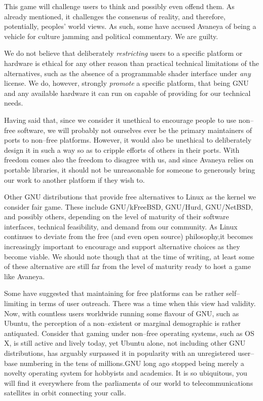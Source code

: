 This game will challenge users to think and possibly even offend them. As already mentioned, it challenges the consensus of reality, and therefore, potentially, peoples' world views. As such, some have accused Avaneya of being a vehicle for culture jamming and political commentary. We are guilty. 

We do not believe that deliberately {\it restricting} users to a specific platform or hardware is ethical for any other reason than practical technical limitations of the alternatives, such as the absence of a programmable shader interface under {\it any} license. We do, however, strongly {\it promote} a specific platform, that being GNU and any available hardware it can run on capable of providing for our technical needs.

Having said that, since we consider it unethical to encourage people to use non--free software, we will probably not ourselves ever be the primary maintainers of ports to non--free platforms. However, it would also be unethical to deliberately design it in such a way so as to cripple efforts of others in their ports. With freedom comes also the freedom to disagree with us, and since Avaneya relies on portable libraries, it should not be unreasonable for someone to generously bring our work to another platform if they wish to.

Other GNU distributions that provide free alternatives to Linux as the kernel we consider fair game. These include GNU/kFreeBSD, GNU/Hurd, GNU/NetBSD, and possibly others, depending on the level of maturity of their software interfaces, technical feasibility, and demand from our community. As Linux continues to deviate from the free (and even open source) philosophy, it becomes increasingly important to encourage and support alternative choices as they become viable. We should note though that at the time of writing, at least some of these alternative are still far from the level of maturity ready to host a game like Avaneya.

Some have suggested that maintaining for free platforms can be rather self--limiting in terms of user outreach. There was a time when this view had validity. Now, with countless users worldwide running some flavour of GNU, such as Ubuntu, the perception of a non--existent or marginal demographic is rather antiquated. Consider that gaming under non--free operating systems, such as OS X, is still active and lively today, yet Ubuntu alone, not including other GNU distributions, has arguably surpassed it in popularity with an unregistered user--base numbering in the tens of millions. GNU long ago stopped being merely a novelty operating system for hobbyists and academics. It is so ubiquitous, you will find it everywhere from the parliaments of our world to telecommunications satellites in orbit connecting your calls.

\StopChapter

